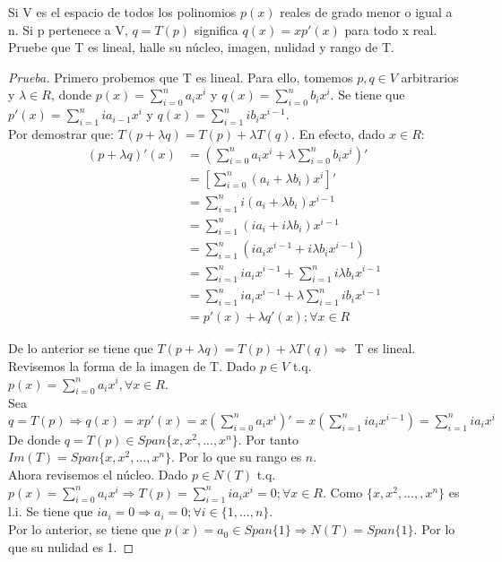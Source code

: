 \documentclass[12pt]{article}
\newenvironment{problem}[2][Problem]{\begin{trivlist}
\item[\hskip \labelsep {\bfseries #1}\hskip \labelsep {\bfseries #2.}]}{\end{trivlist}}
\begin{document}
\begin{problem}[Problema]{2.d}
Si V es el espacio de todos los polinomios $p(x)$ reales de grado menor o igual a n. Si p pertenece a V,  $q=T(p)$ significa $q(x)=xp'(x)$ para todo x real. Pruebe que T es lineal, halle su núcleo, imagen, nulidad y rango de T.
\end{problem}

\begin{proof}[Prueba]
Primero probemos que T es lineal. Para ello, tomemos $p, q \in V$ arbitrarios y $\lambda \in R$, donde $p(x)=\sum_{i=0}^{n} a_{i}x^{i}$ y $q(x)=\sum_{i=0}^{n} b_{i}x^{i}$. Se tiene que $p'(x)=\sum_{i=1}^{n} ia_{i-1}x^{i}$ y $q(x)=\sum_{i=1}^{n} ib_{i}x^{i-1}$.\\
Por demostrar que: $T(p + \lambda q) = T(p) + \lambda T(q)$. En efecto, dado $x \in R$:\\

\begin{align*}
(p + \lambda q)'(x) & = (\sum_{i=0}^{n} a_{i}x^{i} + \lambda \sum_{i=0}^{n} b_{i}x^{i})'\\
& = [\sum_{i=0}^{n} (a_{i} + \lambda b_{i})x^{i}]'\\
& = \sum_{i=1}^{n} i(a_{i} + \lambda b_{i})x^{i-1}\\
& = \sum_{i=1}^{n} (ia_{i} + i\lambda b_{i})x^{i-1}\\
& = \sum_{i=1}^{n} (ia_{i}x^{i-1} + i\lambda b_{i}x^{i-1})\\
& = \sum_{i=1}^{n}ia_{i}x^{i-1} + \sum_{i=1}^{n}i\lambda b_{i}x^{i-1}\\
& = \sum_{i=1}^{n}ia_{i}x^{i-1} + \lambda \sum_{i=1}^{n}i b_{i}x^{i-1}\\
& = p'(x) + \lambda q'(x); \forall x \in R
\end{align*}

De lo anterior se tiene que $T(p + \lambda q) = T(p) + \lambda T(q) \Longrightarrow$ T es lineal.\\

Revisemos la forma de la imagen de T. Dado $p \in V$ t.q. $p(x)=\sum_{i=0}^{n}a_{i}x^{i}, \forall x \in R$. \\
Sea $q=T(p) \Longrightarrow q(x)=xp'(x)=x(\sum_{i=0}^{n}a_{i}x^{i})'= 
	  x(\sum_{i=1}^{n}ia_{i}x^{i-1})=\sum_{i=1}^{n}ia_{i}x^{i}$\\
De donde $q=T(p) \in Span\{x, x^{2}, ..., x^{n}\}$. Por tanto $Im(T)=Span\{x, x^{2}, ..., x^{n}\}$. Por lo que su rango es $n$.\\

Ahora revisemos el núcleo. Dado $p \in N(T)$ t.q. $p(x) = \sum_{i=0}^{n}a_{i}x^{i} \Longrightarrow 
T(p)=\sum_{i=1}^{n}ia_{i}x^{i}= 0; \forall x \in R$. Como $\{x, x^{2}, ..., , x^{n}\}$ es l.i. Se tiene que $ia_{i}=0 \Longrightarrow a_{i}=0; \forall i \in \{1,...,n\}$.\\
Por lo anterior, se tiene que $p(x)=a_{0} \in Span\{1\} \Longrightarrow N(T)=Span\{1\}$. Por lo que su nulidad es 1.
\end{proof}
\end{document}
